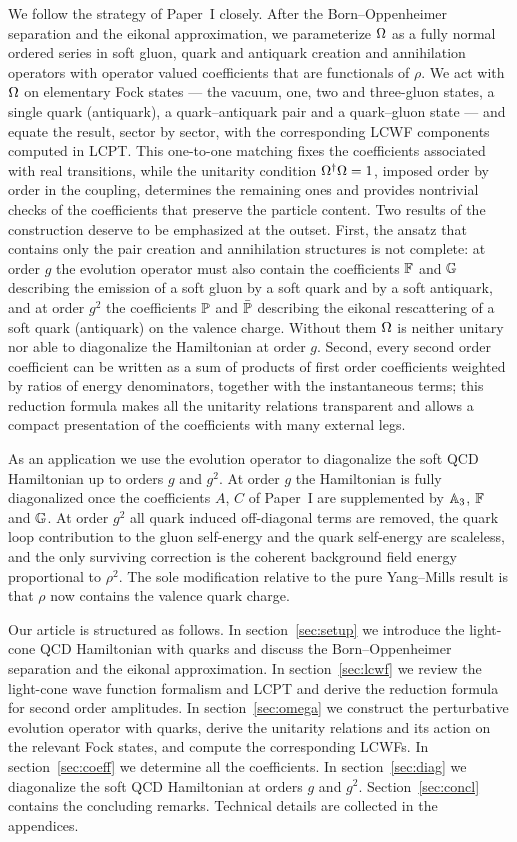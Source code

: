 We follow the strategy of Paper~I closely. After the Born--Oppenheimer separation and the
eikonal approximation, we parameterize $\Omega$ as a fully normal ordered series in soft gluon,
quark and antiquark creation and annihilation operators with operator valued coefficients that
are functionals of $\rho$. We act with $\Omega$ on elementary Fock states --- the vacuum, one, two
and three-gluon states, a single quark (antiquark), a quark--antiquark pair and a
quark--gluon state --- and equate the result, sector by sector, with the corresponding LCWF
components computed in LCPT. This one-to-one matching fixes the coefficients associated with
real transitions, while the unitarity condition $\Omega^{\dagger}\Omega=1$, imposed order by order in the
coupling, determines the remaining ones and provides nontrivial checks of the coefficients that
preserve the particle content. Two results of the construction deserve to be emphasized at the
outset. First, the ansatz that contains only the pair creation and annihilation structures is
not complete: at order $g$ the evolution operator must also contain the coefficients
$\mathbb{F}$ and $\mathbb{G}$ describing the emission of a soft gluon by a soft quark and by a soft
antiquark, and at order $g^{2}$ the coefficients $\mathbb{P}$ and $\bar{\mathbb{P}}$ describing the
eikonal rescattering of a soft quark (antiquark) on the valence charge. Without them $\Omega$ is
neither unitary nor able to diagonalize the Hamiltonian at order $g$. Second, every second order
coefficient can be written as a sum of products of first order coefficients weighted by ratios
of energy denominators, together with the instantaneous terms; this reduction formula makes all
the unitarity relations transparent and allows a compact presentation of the coefficients with
many external legs.

As an application we use the evolution operator to diagonalize the soft QCD Hamiltonian up to
orders $g$ and $g^{2}$. At order $g$ the Hamiltonian is fully diagonalized once the coefficients
$A$, $C$ of Paper~I are supplemented by $\mathbb{A}_{3}$, $\mathbb{F}$ and $\mathbb{G}$. At order $g^{2}$ all
quark induced off-diagonal terms are removed, the quark loop contribution to the gluon
self-energy and the quark self-energy are scaleless, and the only surviving correction is the
coherent background field energy proportional to $\rho^{2}$. The sole modification relative to
the pure Yang--Mills result is that $\rho$ now contains the valence quark charge.

Our article is structured as follows. In section~\ref{sec:setup} we introduce the light-cone QCD
Hamiltonian with quarks and discuss the Born--Oppenheimer separation and the eikonal
approximation. In section~\ref{sec:lcwf} we review the light-cone wave function formalism and
LCPT and derive the reduction formula for second order amplitudes. In
section~\ref{sec:omega} we construct the perturbative evolution operator with quarks, derive the
unitarity relations and its action on the relevant Fock states, and compute the corresponding
LCWFs. In section~\ref{sec:coeff} we determine all the coefficients. In section~\ref{sec:diag} we
diagonalize the soft QCD Hamiltonian at orders $g$ and $g^{2}$. Section~\ref{sec:concl} contains
the concluding remarks. Technical details are collected in the appendices.

